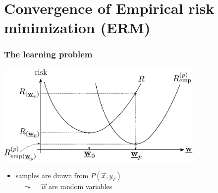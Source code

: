 \section{Convergence of Empirical risk minimization (ERM)}

\begin{frame}\frametitle{The learning problem}
	\begin{center} 
		\includegraphics[height=5cm]{img/section2_fig1.pdf} 
	\end{center}
	\begin{itemize}
		\item {\footnotesize samples are drawn \iid from $P(\vec x, y_T)$\\[1mm]
			 $\quad \leadsto \quad$ $\vec w$ are random variables}
	\end{itemize}
\end{frame}


